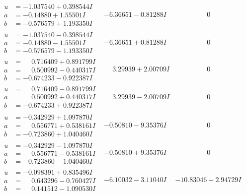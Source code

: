 \documentclass[1p]{elsarticle_modified}
\theoremstyle{definition}
\begin{document}
$$\begin{array}{c|c|c}
\begin{aligned}
u &= -1.037540 + 0.398544 I \\
a &= -0.14880 + 1.55501 I \\
b &= -0.576579 + 1.193350 I\end{aligned}
 & -6.36651 - 0.81288 I & \phantom{-0.000000 } 0 \\ \hline\begin{aligned}
u &= -1.037540 - 0.398544 I \\
a &= -0.14880 - 1.55501 I \\
b &= -0.576579 - 1.193350 I\end{aligned}
 & -6.36651 + 0.81288 I & \phantom{-0.000000 } 0 \\ \hline\begin{aligned}
u &= \phantom{-}0.716409 + 0.891799 I \\
a &= \phantom{-}0.500992 - 0.440317 I \\
b &= -0.674233 - 0.922387 I\end{aligned}
 & \phantom{-}3.29939 + 2.00709 I & \phantom{-0.000000 } 0 \\ \hline\begin{aligned}
u &= \phantom{-}0.716409 - 0.891799 I \\
a &= \phantom{-}0.500992 + 0.440317 I \\
b &= -0.674233 + 0.922387 I\end{aligned}
 & \phantom{-}3.29939 - 2.00709 I & \phantom{-0.000000 } 0 \\ \hline\begin{aligned}
u &= -0.342929 + 1.097870 I \\
a &= \phantom{-}0.556771 + 0.538161 I \\
b &= -0.723860 + 1.040460 I\end{aligned}
 & -0.50810 - 9.35376 I & \phantom{-0.000000 } 0 \\ \hline\begin{aligned}
u &= -0.342929 - 1.097870 I \\
a &= \phantom{-}0.556771 - 0.538161 I \\
b &= -0.723860 - 1.040460 I\end{aligned}
 & -0.50810 + 9.35376 I & \phantom{-0.000000 } 0 \\ \hline\begin{aligned}
u &= -0.098391 + 0.835496 I \\
a &= \phantom{-}0.643296 - 0.760427 I \\
b &= \phantom{-}0.141512 - 1.090530 I\end{aligned}
 & -6.10032 - 3.11040 I & -10.83046 + 2.94729 I \\ \hline\begin{aligned}

\end{aligned}
\end{array}$$
\end{document}

